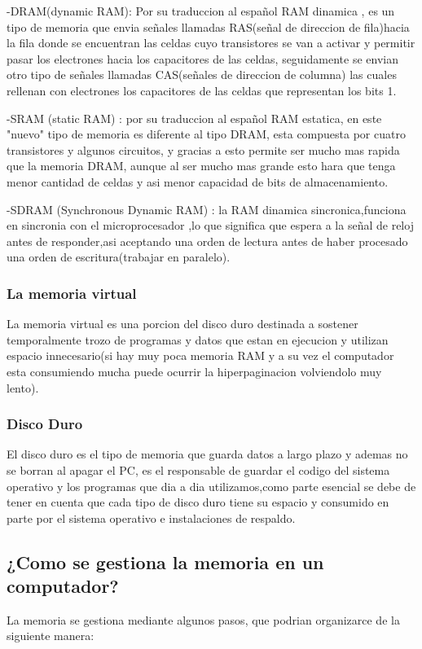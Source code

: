 \documentclass{article}
\begin{document}
            -DRAM(dynamic RAM): Por su traduccion al español RAM dinamica , es un tipo de memoria que envia señales llamadas RAS(señal de direccion de fila)hacia la fila donde se encuentran las celdas cuyo transistores se van a activar y permitir  pasar los electrones hacia los capacitores de las celdas, seguidamente se envian otro tipo de señales llamadas CAS(señales de direccion de columna) las cuales  rellenan con electrones los capacitores de las celdas que representan los bits 1.
            
            -SRAM (static RAM) : por su traduccion al español RAM estatica, en este "nuevo" tipo de memoria es diferente al tipo DRAM, esta compuesta por cuatro transistores y algunos circuitos, y gracias a esto permite ser mucho mas rapida que la memoria DRAM, aunque al ser mucho mas grande esto hara que tenga menor cantidad de celdas y asi menor capacidad de bits de almacenamiento.
            
            -SDRAM (Synchronous Dynamic RAM) : la RAM dinamica sincronica,funciona en sincronia con el microprocesador ,lo que significa que espera a la señal de reloj antes de responder,asi aceptando una orden de lectura antes  de haber procesado una orden de escritura(trabajar en paralelo).\cite{hardzone}
            
        \subsubsection{La memoria virtual}
        La memoria virtual es una porcion del disco duro destinada a sostener temporalmente trozo de programas y datos que estan en ejecucion y utilizan espacio innecesario(si hay muy poca memoria RAM y a su vez el computador esta consumiendo mucha puede ocurrir la hiperpaginacion volviendolo muy lento).

        \subsubsection{Disco Duro}
        El disco duro es el tipo de memoria que guarda datos a largo plazo y ademas no se borran al apagar el PC, es el responsable de guardar el codigo del sistema operativo y los programas que dia a dia utilizamos,como parte esencial se debe de tener en cuenta que cada tipo de disco duro tiene su espacio y consumido en parte por el sistema operativo e instalaciones de respaldo.\cite{digitaltrends}
        
        
    \subsection{¿Como se gestiona la memoria en un computador?}
    La memoria se gestiona mediante algunos pasos, que podrian organizarce de la siguiente manera:
    
\end{document}
